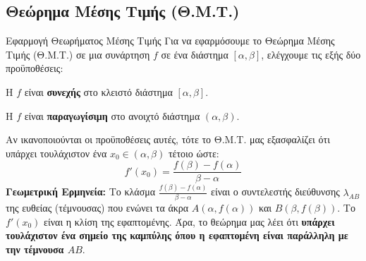\subsection{Θεώρημα Μέσης Τιμής (Θ.Μ.Τ.)}
\begin{askhsh}{Εφαρμογή Θεωρήματος Μέσης Τιμής}
Για να εφαρμόσουμε το Θεώρημα Μέσης Τιμής (Θ.Μ.Τ.) σε μια συνάρτηση $f$ σε ένα διάστημα $[\alpha,\beta]$, ελέγχουμε τις εξής δύο προϋποθέσεις:

\bhmata
\begin{bhma}
\item Η $f$ είναι \textbf{συνεχής} στο κλειστό διάστημα $[\alpha,\beta]$.
\item Η $f$ είναι \textbf{παραγωγίσιμη} στο ανοιχτό διάστημα $(\alpha,\beta)$.
\end{bhma}
Αν ικανοποιούνται οι προϋποθέσεις αυτές, τότε το Θ.Μ.Τ. μας εξασφαλίζει ότι υπάρχει τουλάχιστον ένα $x_0 \in (\alpha,\beta)$ τέτοιο ώστε:
\[ f'(x_0) = \frac{f(\beta)-f(\alpha)}{\beta-\alpha} \]
\textbf{Γεωμετρική Ερμηνεία:} Το κλάσμα $\frac{f(\beta)-f(\alpha)}{\beta-\alpha}$ είναι ο συντελεστής διεύθυνσης $\lambda_{AB}$ της ευθείας (τέμνουσας) που ενώνει τα άκρα $A(\alpha, f(\alpha))$ και $B(\beta, f(\beta))$. Το $f'(x_0)$ είναι η κλίση της εφαπτομένης. Άρα, το θεώρημα μας λέει ότι \textbf{υπάρχει τουλάχιστον ένα σημείο της καμπύλης όπου η εφαπτομένη είναι παράλληλη με την τέμνουσα $AB$}.
\end{askhsh}


